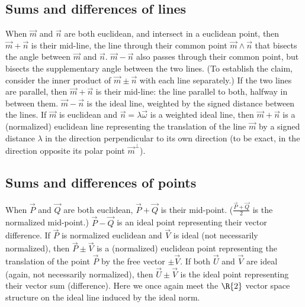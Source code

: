 \documentclass{birkjour}
\begin{document}
\subsection{Sums and differences of lines} When $\vec{m}$ and $\vec{n}$ are both  euclidean,  and intersect in a euclidean point, then $\vec{m} + \vec{n}$ is their mid-line, the line through their common point $\vec{m} \wedge \vec{n}$ that bisects the angle between $\vec{m}$ and $\vec{n}$.  $\vec{m} - \vec{n}$  also passes through their common point, but bisects the supplementary angle between the two lines. (To establish the claim, consider the inner product of $\vec{m} \pm \vec{n}$ with each line separately.) If the two lines are parallel, then  $\vec{m} + \vec{n}$ is their mid-line: the line parallel to both, halfway in between them.    $\vec{m} - \vec{n}$ is the ideal line, weighted by the signed distance between the lines. If $\vec{m}$ is euclidean and $\vec{n} = \lambda \vec{\omega}$ is a weighted ideal line, then $\vec{m} + \vec{n}$ is a (normalized) euclidean  line representing the translation of the line $\vec{m}$ by a signed distance $\lambda$ in the direction perpendicular to its own direction (to  be exact, in the direction opposite its polar point $\vec{m}^{\perp}$).  %
 
 \subsection{Sums and differences of points} 
 \label{sec:sumdiffpts}
 When $\vec{P}$ and $\vec{Q}$ are both euclidean, $\vec{P} + \vec{Q}$ is their mid-point.  ($\frac{\vec{P} + \vec{Q}}{2}$ is the normalized mid-point.)  $\vec{P} - \vec{Q}$ is an ideal point representing their vector difference.  If $\vec{P}$ is normalized euclidean and $\vec{V}$ is ideal (not necessarily normalized), then $\vec{P} \pm \vec{V}$ is a (normalized) euclidean  point representing the translation of the point $\vec{P}$ by the free vector $\pm\vec{V}$. If both $\vec{U}$ and $\vec{V}$ are ideal (again, not necessarily normalized), then $\vec{U} \pm \vec{V}$ is the ideal point representing their vector sum (difference).  Here we once again meet the $\R{2}$ vector space structure on the ideal line induced by the ideal norm. %
\end{document}
